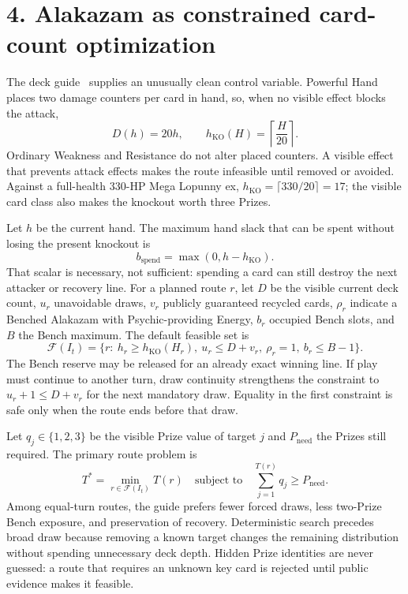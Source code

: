 \section*{4. Alakazam as constrained card-count optimization}

The deck guide~\cite{projectAlakazamGuide2026} supplies an unusually clean
control variable. Powerful Hand places two damage counters per card in hand,
so, when no visible effect blocks the attack,
\[
 D(h)=20h,\qquad
 h_{\mathrm{KO}}(H)=\left\lceil\frac{H}{20}\right\rceil .
\]
Ordinary Weakness and Resistance do not alter placed counters. A visible
effect that prevents attack effects makes the route infeasible until removed
or avoided. Against a full-health 330-HP Mega Lopunny ex,
$h_{\mathrm{KO}}=\lceil330/20\rceil=17$; the visible card class also makes
the knockout worth three Prizes.

Let $h$ be the current hand. The maximum hand slack that can be spent without
losing the present knockout is
\[
 b_{\mathrm{spend}}=\max(0,h-h_{\mathrm{KO}}).
\]
That scalar is necessary, not sufficient: spending a card can still destroy
the next attacker or recovery line. For a planned route $r$, let $D$ be the
visible current deck count, $u_r$ unavoidable draws, $v_r$ publicly guaranteed
recycled cards, $\rho_r$ indicate a Benched Alakazam with
Psychic-providing Energy, $b_r$ occupied Bench slots, and $B$ the Bench
maximum. The default feasible set is
\[
 \mathcal F(I_t)=\{r:\ h_r\ge h_{\mathrm{KO}}(H_r),\ 
 u_r\le D+v_r,\ \rho_r=1,\ b_r\le B-1\}.
\]
The Bench reserve may be released for an already exact winning line. If play
must continue to another turn, draw continuity strengthens the constraint to
$u_r+1\le D+v_r$ for the next mandatory draw. Equality in the first
constraint is safe only when the route ends before that draw.

Let $q_j\in\{1,2,3\}$ be the visible Prize value of target $j$ and
$P_{\mathrm{need}}$ the Prizes still required. The primary route problem is
\[
 T^*=\min_{r\in\mathcal F(I_t)}T(r)
 \quad\text{subject to}\quad
 \sum_{j=1}^{T(r)}q_j\ge P_{\mathrm{need}} .
\]
Among equal-turn routes, the guide prefers fewer forced draws, less two-Prize
Bench exposure, and preservation of recovery. Deterministic search precedes
broad draw because removing a known target changes the remaining distribution
without spending unnecessary deck depth. Hidden Prize identities are never
guessed: a route that requires an unknown key card is rejected until public
evidence makes it feasible.
